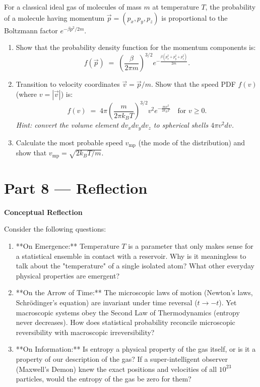 \documentclass[12pt, a4paper, twoside]{book}
\newcounter{problem}[chapter]
\begin{document}
\begin{deepproblem}
For a classical ideal gas of molecules of mass $m$ at temperature $T$, the probability of a molecule having momentum $\vec{p} = (p_x, p_y, p_z)$ is proportional to the Boltzmann factor $e^{-\beta p^2/2m}$.
\begin{enumerate}[label=(\alph*)]
  \item Show that the probability density function for the momentum components is:
  \[
    f(\vec{p}) \;=\; \left(\frac{\beta}{2\pi m}\right)^{3/2} e^{-\frac{\beta (p_x^2 + p_y^2 + p_z^2)}{2m}}.
  \]
  \item Transition to velocity coordinates $\vec{v} = \vec{p}/m$. Show that the speed PDF $f(v)$ (where $v = |\vec{v}|$) is:
  \[
    f(v) \;=\; 4\pi \left(\frac{m}{2\pi k_B T}\right)^{3/2} v^2 e^{-\frac{m v^2}{2 k_B T}} \quad \text{for } v \ge 0.
  \]
  \textit{Hint: convert the volume element $dv_x dv_y dv_z$ to spherical shells $4\pi v^2 dv$.}
  \item Calculate the most probable speed $v_{\text{mp}}$ (the mode of the distribution) and show that $v_{\text{mp}} = \sqrt{2 k_B T / m}$.
\end{enumerate}
\end{deepproblem}

\newpage

\section{Part 8 --- Reflection}

\begin{reflectionbox}
\textbf{Conceptual Reflection}

Consider the following questions:
\begin{enumerate}
  \item **On Emergence:** Temperature $T$ is a parameter that only makes sense for a statistical ensemble in contact with a reservoir. Why is it meaningless to talk about the "temperature" of a single isolated atom? What other everyday physical properties are emergent?
  \item **On the Arrow of Time:** The microscopic laws of motion (Newton's laws, Schrödinger's equation) are invariant under time reversal ($t \to -t$). Yet macroscopic systems obey the Second Law of Thermodynamics (entropy never decreases). How does statistical probability reconcile microscopic reversibility with macroscopic irreversibility?
  \item **On Information:** Is entropy a physical property of the gas itself, or is it a property of our description of the gas? If a super-intelligent observer (Maxwell's Demon) knew the exact positions and velocities of all $10^{23}$ particles, would the entropy of the gas be zero for them?
\end{enumerate}
\end{reflectionbox}
\end{document}
